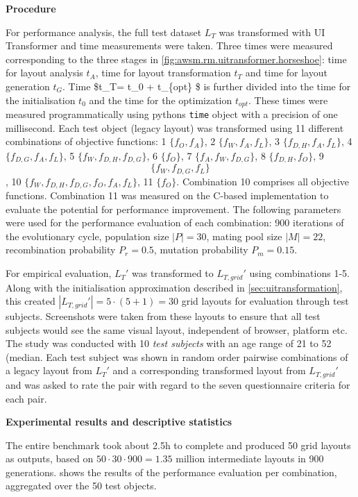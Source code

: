 \textbf{Procedure}

For performance analysis, the full test dataset \(L_T\) was transformed with UI Transformer and time measurements were taken.
Three times were measured corresponding to the three stages in \cref{fig:awsm.rm.uitransformer.horseshoe}: time for layout analysis \(t_A\), time for layout transformation \(t_T\) and time for layout generation \(t_G\).
Time \$t\_T= t\_0 + t\_\{opt\} \$ is further divided into the time for the initialisation \(t_{0}\) and the time for the optimization \(t_{opt}\).
These times were measured programmatically using pythons \texttt{time} object with a precision of one millisecond.
Each test object (legacy layout) was transformed using 11 different combinations of objective functions: 1 \(\{f_O, f_A\}\), 2 \(\{f_W, f_A, f_L\}\), 3 \(\{f_{D,H}, f_A, f_L\}\), 4 \(\{f_{D,G}, f_A, f_L\}\), 5 \(\{f_W, f_{D,H}, f_{D,G}\}\), 6 \(\{f_O\}\), 7 \(\{f_A, f_{W}, f_{D,G}\}\), 8 \(\{f_{D,H}, f_O\}\), 9 \[\{f_W, f_{D,G}, f_L\}\], 10 \(\{f_W, f_{D,H}, f_{D,G}, f_O, f_A, f_L\}\), 11 \(\{f_O\}\).
Combination 10 comprises all objective functions.
Combination 11 was measured on the C-based implementation to evaluate the potential for performance improvement.
The following parameters were used for the performance evaluation of each combination: 900 iterations of the evolutionary cycle, population size \(|P| = 30\), mating pool size \(|M| = 22\), recombination probability \(P_r = 0.5\), mutation probability \(P_m = 0.15\).

For empirical evaluation, \(L_T'\) was transformed to \(L_{T, grid}'\) using combinations 1-5.
Along with the initialisation approximation described in \cref{sec:uitransformation}, this created \(|L_{T, grid}'| = 5 \cdot(5+1)=30\) grid layouts for evaluation through test subjects.
Screenshots were taken from these layouts to ensure that all test subjects would see the same visual layout, independent of browser, platform etc.
The study was conducted with 10 \emph{test subjects} with an age range of 21 to 52 (median.
Each test subject was shown in random order pairwise combinations of a legacy layout from \(L_T'\) and a corresponding transformed layout from \(L_{T, grid}'\) and was asked to rate the pair with regard to the seven questionnaire criteria for each pair.

\textbf{Experimental results and descriptive statistics}

The entire benchmark took about 2.5h to complete and produced 50 grid layouts as outputs, based on \(50\cdot 30\cdot 900 = 1.35\) million intermediate layouts in 900 generations.
 shows the results of the performance evaluation per combination, aggregated over the 50 test objects.

